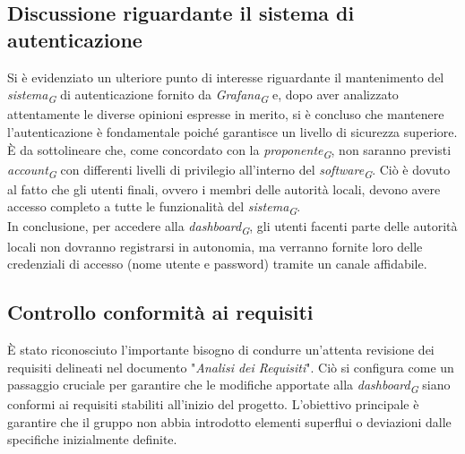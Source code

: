 \documentclass{article}
\begin{document}
    \subsection{Discussione riguardante il sistema di autenticazione}
    Si è evidenziato un ulteriore punto di interesse riguardante il mantenimento del \textit{sistema}\textsubscript{\textit{G}} di autenticazione fornito da \textit{Grafana}\textsubscript{\textit{G}} e, dopo aver analizzato attentamente le diverse opinioni espresse in merito, si è concluso che mantenere l'autenticazione è fondamentale poiché garantisce un livello di sicurezza superiore. \\
    È da sottolineare che, come concordato con la \textit{proponente}\textsubscript{\textit{G}}, non saranno previsti \textit{account}\textsubscript{\textit{G}} con differenti livelli di privilegio all'interno del \textit{software}\textsubscript{\textit{G}}. Ciò è dovuto al fatto che gli utenti finali, ovvero i membri delle autorità locali, devono avere accesso completo a tutte le funzionalità del \textit{sistema}\textsubscript{\textit{G}}. \\
    In conclusione, per accedere alla \textit{dashboard}\textsubscript{\textit{G}}, gli utenti facenti parte delle autorità locali non dovranno registrarsi in autonomia, ma verranno fornite loro delle credenziali di accesso (nome utente e password) tramite un canale affidabile.

    \subsection{Controllo conformità ai requisiti}
    È stato riconosciuto l'importante bisogno di condurre un'attenta revisione dei requisiti delineati nel documento "\textit{Analisi dei Requisiti}". Ciò si configura come un passaggio cruciale per garantire che le modifiche apportate alla \textit{dashboard}\textsubscript{\textit{G}} siano conformi ai requisiti stabiliti all'inizio del progetto. L'obiettivo principale è garantire che il gruppo non abbia introdotto elementi superflui o deviazioni dalle specifiche inizialmente definite.
\end{document}
